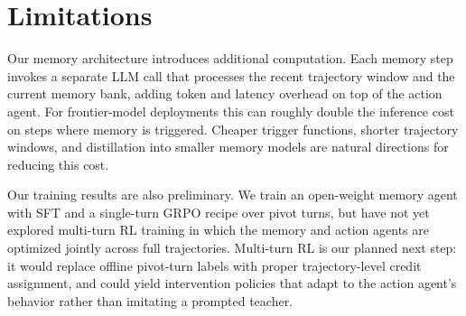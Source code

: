 \section*{Limitations}

Our memory architecture introduces additional computation. Each memory step
invokes a separate LLM call that processes the recent trajectory window and
the current memory bank, adding token and latency overhead on top of the
action agent. For frontier-model deployments this can roughly double the
inference cost on steps where memory is triggered. Cheaper trigger functions,
shorter trajectory windows, and distillation into smaller memory models are
natural directions for reducing this cost.

Our training results are also preliminary. We train an open-weight memory
agent with SFT and a single-turn GRPO recipe over pivot turns, but have not
yet explored multi-turn RL training in which the memory and action agents are
optimized jointly across full trajectories. Multi-turn RL is our planned
next step: it would replace offline pivot-turn labels with proper
trajectory-level credit assignment, and could yield intervention policies
that adapt to the action agent's behavior rather than imitating a prompted
teacher.
